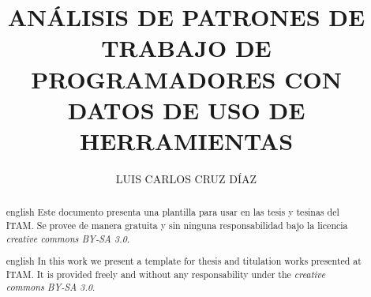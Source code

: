 \documentclass{tesisITAM}
\title{ANÁLISIS DE PATRONES DE TRABAJO DE PROGRAMADORES CON DATOS DE USO DE HERRAMIENTAS}
\author{LUIS CARLOS CRUZ DÍAZ}
\begin{document}
	\maketitle
	\publicationrights


	\begin{abstract}{english}
		Este documento presenta una plantilla para usar en las tesis y tesinas del ITAM. Se provee de manera gratuita y sin ninguna responsabilidad bajo la licencia \emph{creative commons BY-SA 3.0}.
	\end{abstract}

	\begin{abstract}{english}
		In this work we present a template for thesis and titulation works presented at ITAM. It is provided freely and without any responsability under the \emph{creative commons BY-SA 3.0}. 
	\end{abstract}


	\setcounter{page}{1}

	\tableofcontents
	\listoffigures
	\listoftables
	\newpage

	\setcounter{page}{1}




	 

	 


	\appendix

	\clearpage
	
\end{document}
